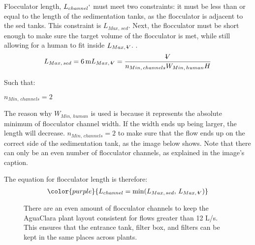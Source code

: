 \documentclass[letterpaper,10pt,english]{sphinxmanual}
\let\sphinxpxdimen\pdfpxdimen\else\newdimen\sphinxpxdimen
\begin{document}
\section{}
\label{\detokenize{Flocculation/Floc_Design:length}}
Flocculator length, \(L_{channel}`\) must meet two constraints: it must be less than or equal to the length of the sedimentation tanks, as the flocculator is adjacent to the sed tanks. This constraint is \(L_{Max, \, sed}\). Next, the flocculator must be short enough to make sure the target volume of the flocculator is met, while still allowing for a human to fit inside \(L_{Max, \, \rlap{-} V}\). .
\begin{equation}\label{equation:Flocculation/Floc_Design:Flocculation/Floc_Design:18}
\begin{split}L_{Max, \, sed} = 6 \, {\rm m}
L_{Max, \, \rlap{-}V} = \frac{\rlap{-} V}{n_{Min, \, channels} W_{Min, \, human} H}\end{split}
\end{equation}
\begin{DUlineblock}{0em}
\item[] Such that:
\item[] \(n_{Min, \, channels} = 2\)
\end{DUlineblock}

The reason why \(W_{Min, \, human}\) is used is because it represents the absolute minimum of flocculator channel width. If the width ends up being larger, the length will decrease. \(n_{Min, \, channels} = 2\)  to make sure that the flow ends up on the correct side of the sedimentation tank, as the image below shows. Note that there can only be an even number of flocculator channels, as explained in the image’s caption.

The equation for  flocculator length is therefore:
\begin{equation}\label{equation:Flocculation/Floc_Design:Flocculation/Floc_Design:19}
\begin{split}\color{purple}{
L_{channel} = {\rm min}(L_{Max, \, sed}, \, L_{Max, \, \rlap{-} V})
}\end{split}
\end{equation}
\begin{figure}[htbp]
\centering
\capstart

\noindent\sphinxincludegraphics[width=600\sphinxpxdimen]{{Floc_channels}.jpg}
\caption{There are an even amount of flocculator channels to keep the AguaClara plant layout consistent for flows greater than 12 L/s. This ensures that the entrance tank, filter box, and filters can be kept in the same places across plants.}\label{\detokenize{Flocculation/Floc_Design:id16}}\label{\detokenize{Flocculation/Floc_Design:figure-floc-channels}}\end{figure}
\end{document}
